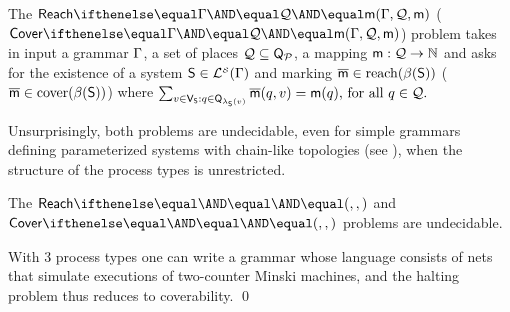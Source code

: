 \begin{definition}\label{def:grammar-parameterized-verif}
  The $\paramreach{\grammar}{\mathcal{Q}}{\amark}$
  (\resp $\paramcover{\grammar}{\mathcal{Q}}{\amark}$) problem takes
  in input a grammar $\Gamma$, a set of places $\mathcal{Q}
  \subseteq \mathsf{Q}_{\mathcal{P}}$, a mapping $\mathsf{m} : \mathcal{Q}
  \rightarrow\mathbb{N}$ and asks for the existence of a system
  $\mathsf{S}\in\mathcal{L}_{}^{\scriptscriptstyle{\mathcal{S}}}({\Gamma})$ and marking
  $\overline{\mathsf{m}}\in\mathrm{reach}({\beta({\mathsf{S}})})$
  (\resp $\overline{\mathsf{m}}\in\mathrm{cover}({\beta({\mathsf{S}})})$) where 
  \(\sum_{v \in \mathsf{V}_{\mathsf{S}}:q \in \mathsf{Q}_{\lambda_{\mathsf{S}}(v)}}
  \overline{\mathsf{m}}(q,v)=\mathsf{m}(q) \text{, for all } q \in
  \mathcal{Q}.\)
\end{definition}
Unsurprisingly, both problems are undecidable, even for simple
grammars defining parameterized systems with chain-like topologies
(see ), when the structure of the
process types is unrestricted.

\begin{theoremE}[][category=proofs]\label{thm:undecidability}
  The $\paramreach{}{}{}$ and $\paramcover{}{}{}$ problems are
  undecidable.
\end{theoremE}
\begin{proofE}
  
\end{proofE}
\begin{proofSketch}
  With 3 process types one can write a grammar whose language consists of
  nets that simulate executions of two-counter Minski machines,
  and the halting problem thus reduces to coverability.
  \qed
\end{proofSketch}
